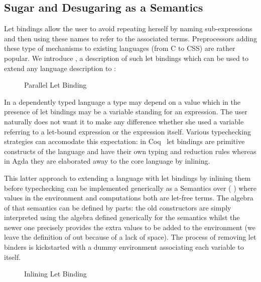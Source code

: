 \subsection{Sugar and Desugaring as a Semantics}\label{section:letbinding}

Let bindings allow the user to avoid repeating herself by naming
sub-expressions and then using these names to refer to the associated
terms. Preprocessors adding these type of mechanisms to existing
languages (from C to CSS) are rather popular. We introduce ,
a description of such let bindings which can be used to extend any
language description  to   :

\begin{figure}[h]
\caption{Parallel Let Binding}
\end{figure}

In a dependently typed language a type may depend on a value which
in the presence of let bindings may be a variable standing for an
expression. The user naturally does not want it to make any difference
whether she used a variable referring to a let-bound expression or
the expression itself. Various typechecking strategies can accomodate
this expectation: in Coq~\cite{Coq:manual} let bindings are primitive
constructs of the language and have their own typing and reduction
rules whereas in Agda they are elaborated away to the core language
by inlining.

This latter approach to extending a language  with let bindings
by inlining them before typechecking can be implemented generically as
a Semantics over (  ) where values in the environment and
computations both are let-free terms. The algebra of that semantics can
be defined by parts: the old constructors are simply interpreted using
the algebra defined generically for the  semantics whilst
the newer one precisely provides the extra values to be added to the
environment (we leave the definition of  out because of a lack
of space). The process of removing let binders is kickstarted with a
dummy environment associating each variable to itself.

\begin{figure}[h]
\begin{minipage}{0.45\textwidth}
\end{minipage}\hspace{2em}
\begin{minipage}{0.45\textwidth}
\end{minipage}
\caption{Inlining Let Binding}
\end{figure}

